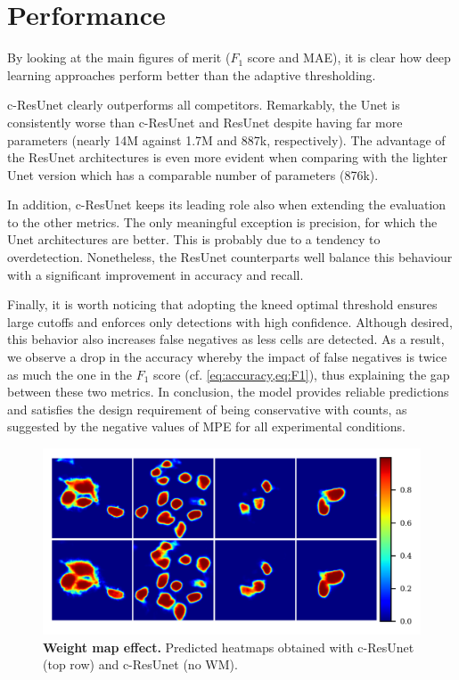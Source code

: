 \section{Performance}

By looking at the main figures of merit ($F_1$ score and MAE), it is clear how deep learning approaches perform better than the adaptive thresholding.

c-ResUnet clearly outperforms all competitors.
Remarkably, the Unet is consistently worse than c-ResUnet and ResUnet despite having far more parameters (nearly 14M against 1.7M and 887k, respectively).
The advantage of the ResUnet architectures is even more evident when comparing with the lighter Unet version which has a comparable number of parameters (876k).

In addition, c-ResUnet keeps its leading role also when extending the evaluation to the other metrics.
The only meaningful exception is precision, for which the Unet architectures are better. This is probably due to a tendency to overdetection. 
Nonetheless, the ResUnet counterparts well balance this behaviour with a significant improvement in accuracy and recall.

Finally, it is worth noticing that adopting the kneed optimal threshold ensures large cutoffs and enforces only detections with high confidence.
Although desired, this behavior also increases false negatives as less cells are detected. 
As a result, we observe a drop in the accuracy whereby the impact of false negatives is twice as much the one in the $F_1$ score (cf. \cref{eq:accuracy,eq:F1}), thus explaining the gap between these two metrics.
In conclusion, the model provides reliable predictions and satisfies the design requirement of being conservative with counts, as suggested by the negative values of MPE for all experimental conditions.

\begin{figure}[!b]
\centering
\includegraphics[width=\textwidth]{figures/130_methods/weigths_effect.png}
\caption{\textbf{Weight map effect.} 
Predicted heatmaps obtained with c-ResUnet (top row) and c-ResUnet (no WM).} 
\label{fig:weigths_effect}
\end{figure}
